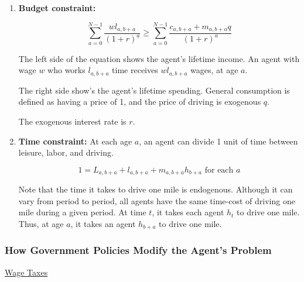\documentclass[letter, 12pt, epsf,leqno]{article}
\begin{document}
\begin{enumerate}
\item \textbf{Budget constraint:}


\begin{equation}\sum_{a=0}^{N-1} \frac{wl_{a, b+a}}{(1+r)^{a}}  \ge \sum_{a=0}^{N-1} \frac{c_{a, b+a}+m_{a, b+a}q}{(1+r)^{a}}\label{eq:budget_constraint}\end{equation}

The left side of the equation shows the agent's lifetime income.  An agent with wage $w$ who works $l_{a, b+a}$ time receives  $wl_{a,b+a}$ wages, at age $a$.

The right side show's the agent's lifetime spending.  General consumption is defined as having a price of 1, and the price of driving is exogenous $q$.

The exogenous interest rate is $r$.




\item \textbf{Time constraint:}
At each age $a$, an agent can divide 1 unit of time between leisure, labor, and driving.

\begin{equation}1 = L_{a, b+a} + l_{a, b+a} + m_{a, b+a}h_{b+a}\text{ for each } a\end{equation}

Note that the time it takes to drive one mile is endogenous.  Although it can vary from period to period, all agents have the same time-cost of driving one mile during a given period.  At time $t$, it takes each agent $h_t$ to drive one mile.  Thus, at age $a$, it takes an agent $h_{b+a}$ to drive one mile.
\end{enumerate}

\subsubsection {How Government Policies Modify the Agent's Problem}
\underline {Wage Taxes}
\end{document}
